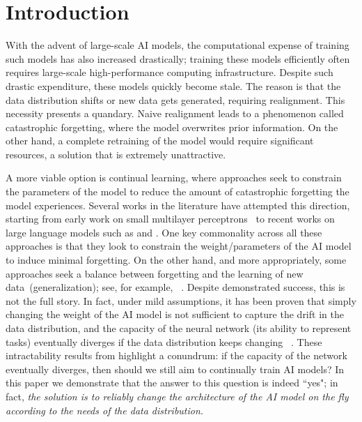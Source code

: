 \section{Introduction}
With the advent of large-scale AI models, the computational expense of training such models has also increased drastically; training these models efficiently often requires large-scale high-performance computing infrastructure. Despite such drastic expenditure, these models quickly become stale. The reason  is that the data distribution shifts or new data  gets generated, 
requiring realignment. This necessity presents a quandary. Naive realignment leads to a phenomenon called catastrophic forgetting, where the model overwrites prior information. On the other hand, a complete retraining of the model would require significant resources, a solution that is extremely unattractive. 

A more viable option is  continual learning, where approaches seek to constrain the parameters of the model to reduce the amount of catastrophic forgetting the model experiences. Several works in the literature have attempted this direction, starting from early work on small multilayer perceptrons~\cite{mccloskey1989catastrophic} to recent works on large language models such as \cite{luo2025empirical, lai2025reinforcement, biderman2024lora} and \cite{lin2025continual}. One key commonality across all  these approaches is that they look to constrain the weight/parameters of the AI model to induce minimal forgetting. On the other hand, and more appropriately, some approaches seek a balance between forgetting and the learning of new data~(generalization); see, for example, ~\cite{raghavan2021formalizing, lu2025rethinking,lin2023theory}. Despite demonstrated success, this is not the full story. In fact,  under mild assumptions, it has been proven that simply changing the weight of the AI model is not sufficient to capture the drift in the data distribution, and the capacity of the neural network (its ability to represent tasks) eventually diverges if the data distribution keeps changing ~\cite{chakraborty2025understanding}. These intractability results from \cite{chakraborty2025understanding} highlight a conundrum:  if the capacity of the network eventually diverges, then should we still aim to continually train AI models?
In this paper we demonstrate that the answer to this question is indeed ``yes"; in fact, \textit{the solution is to reliably change the architecture of the AI model on the fly according to the needs of the data distribution.} 

